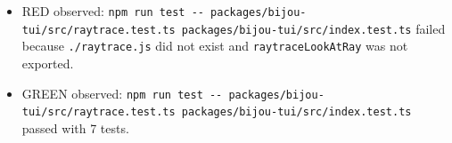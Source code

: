 \begin{itemize}
\tightlist
\item
  RED observed: \texttt{n\allowbreak{}p\allowbreak{}m\allowbreak{} \allowbreak{}r\allowbreak{}u\allowbreak{}n\allowbreak{} \allowbreak{}t\allowbreak{}e\allowbreak{}s\allowbreak{}t\allowbreak{} \allowbreak{}-\allowbreak{}-\allowbreak{} \allowbreak{}p\allowbreak{}a\allowbreak{}c\allowbreak{}k\allowbreak{}a\allowbreak{}g\allowbreak{}e\allowbreak{}s\allowbreak{}/\allowbreak{}b\allowbreak{}i\allowbreak{}j\allowbreak{}o\allowbreak{}u\allowbreak{}-\allowbreak{}t\allowbreak{}u\allowbreak{}i\allowbreak{}/\allowbreak{}s\allowbreak{}r\allowbreak{}c\allowbreak{}/\allowbreak{}r\allowbreak{}a\allowbreak{}y\allowbreak{}t\allowbreak{}r\allowbreak{}a\allowbreak{}c\allowbreak{}e\allowbreak{}.\allowbreak{}t\allowbreak{}e\allowbreak{}s\allowbreak{}t\allowbreak{}.\allowbreak{}t\allowbreak{}s\allowbreak{} \allowbreak{}p\allowbreak{}a\allowbreak{}c\allowbreak{}k\allowbreak{}a\allowbreak{}g\allowbreak{}e\allowbreak{}s\allowbreak{}/\allowbreak{}b\allowbreak{}i\allowbreak{}j\allowbreak{}o\allowbreak{}u\allowbreak{}-\allowbreak{}t\allowbreak{}u\allowbreak{}i\allowbreak{}/\allowbreak{}s\allowbreak{}r\allowbreak{}c\allowbreak{}/\allowbreak{}i\allowbreak{}n\allowbreak{}d\allowbreak{}e\allowbreak{}x\allowbreak{}.\allowbreak{}t\allowbreak{}e\allowbreak{}s\allowbreak{}t\allowbreak{}.\allowbreak{}t\allowbreak{}s} failed because \texttt{.\allowbreak{}/\allowbreak{}r\allowbreak{}a\allowbreak{}y\allowbreak{}t\allowbreak{}r\allowbreak{}a\allowbreak{}c\allowbreak{}e\allowbreak{}.\allowbreak{}j\allowbreak{}s} did not exist and \texttt{r\allowbreak{}a\allowbreak{}y\allowbreak{}t\allowbreak{}r\allowbreak{}a\allowbreak{}c\allowbreak{}e\allowbreak{}L\allowbreak{}o\allowbreak{}o\allowbreak{}k\allowbreak{}A\allowbreak{}t\allowbreak{}R\allowbreak{}a\allowbreak{}y} was not exported.
\item
  GREEN observed: \texttt{n\allowbreak{}p\allowbreak{}m\allowbreak{} \allowbreak{}r\allowbreak{}u\allowbreak{}n\allowbreak{} \allowbreak{}t\allowbreak{}e\allowbreak{}s\allowbreak{}t\allowbreak{} \allowbreak{}-\allowbreak{}-\allowbreak{} \allowbreak{}p\allowbreak{}a\allowbreak{}c\allowbreak{}k\allowbreak{}a\allowbreak{}g\allowbreak{}e\allowbreak{}s\allowbreak{}/\allowbreak{}b\allowbreak{}i\allowbreak{}j\allowbreak{}o\allowbreak{}u\allowbreak{}-\allowbreak{}t\allowbreak{}u\allowbreak{}i\allowbreak{}/\allowbreak{}s\allowbreak{}r\allowbreak{}c\allowbreak{}/\allowbreak{}r\allowbreak{}a\allowbreak{}y\allowbreak{}t\allowbreak{}r\allowbreak{}a\allowbreak{}c\allowbreak{}e\allowbreak{}.\allowbreak{}t\allowbreak{}e\allowbreak{}s\allowbreak{}t\allowbreak{}.\allowbreak{}t\allowbreak{}s\allowbreak{} \allowbreak{}p\allowbreak{}a\allowbreak{}c\allowbreak{}k\allowbreak{}a\allowbreak{}g\allowbreak{}e\allowbreak{}s\allowbreak{}/\allowbreak{}b\allowbreak{}i\allowbreak{}j\allowbreak{}o\allowbreak{}u\allowbreak{}-\allowbreak{}t\allowbreak{}u\allowbreak{}i\allowbreak{}/\allowbreak{}s\allowbreak{}r\allowbreak{}c\allowbreak{}/\allowbreak{}i\allowbreak{}n\allowbreak{}d\allowbreak{}e\allowbreak{}x\allowbreak{}.\allowbreak{}t\allowbreak{}e\allowbreak{}s\allowbreak{}t\allowbreak{}.\allowbreak{}t\allowbreak{}s} passed with 7 tests.

\end{itemize}
